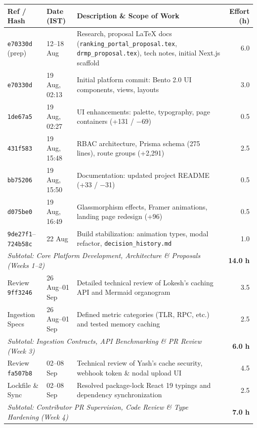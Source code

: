 \documentclass[11pt,a4paper]{article}
\begin{document}
\begin{table}[h]
\centering
\small
\renewcommand{\arraystretch}{1.2}
\begin{tabular}{p{2.2cm} p{2.2cm} p{7.2cm} r}
\toprule
\textbf{Ref / Hash} & \textbf{Date (IST)} & \textbf{Description \& Scope of Work} & \textbf{Effort (h)} \\
\midrule
\texttt{e70330d} (prep) & 12--18 Aug & Research, proposal LaTeX docs (\texttt{ranking\_portal\_proposal.tex}, \texttt{drmp\_proposal.tex}), tech notes, initial Next.js scaffold & 6.0 \\
\texttt{e70330d} & 19 Aug, 02:13 & Initial platform commit: Bento 2.0 UI components, views, layouts & 3.0 \\
\texttt{1de67a5} & 19 Aug, 02:27 & UI enhancements: palette, typography, page containers (+131 / $-$69) & 0.5 \\
\texttt{431f583} & 19 Aug, 15:48 & RBAC architecture, Prisma schema (275 lines), route groups (+2,291) & 2.5 \\
\texttt{bb75206} & 19 Aug, 15:50 & Documentation: updated project README (+33 / $-$31) & 0.5 \\
\texttt{d075be0} & 19 Aug, 16:49 & Glassmorphism effects, Framer animations, landing page redesign (+96) & 0.5 \\
\texttt{9de27f1}--\texttt{724b58c} & 22 Aug & Build stabilization: animation types, modal refactor, \texttt{decision\_history.md} & 1.0 \\
\midrule
\multicolumn{3}{l}{\textit{Subtotal: Core Platform Development, Architecture \& Proposals (Weeks 1--2)}} & \textbf{14.0 h} \\
\midrule
Review \texttt{9ff3246} & 26 Aug--01 Sep & Detailed technical review of Lokesh's caching API and Mermaid organogram & 3.5 \\
Ingestion Specs & 26 Aug--01 Sep & Defined metric categories (TLR, RPC, etc.) and tested memory caching & 2.5 \\
\midrule
\multicolumn{3}{l}{\textit{Subtotal: Ingestion Contracts, API Benchmarking \& PR Review (Week 3)}} & \textbf{6.0 h} \\
\midrule
Review \texttt{fa507b8} & 02--08 Sep & Technical review of Yash's cache security, webhook token \& nodal upload UI & 4.5 \\
Lockfile \& Sync & 02--08 Sep & Resolved package-lock React 19 typings and dependency synchronization & 2.5 \\
\midrule
\multicolumn{3}{l}{\textit{Subtotal: Contributor PR Supervision, Code Review \& Type Hardening (Week 4)}} & \textbf{7.0 h} \\

\end{tabular}
\end{table}
\end{document}

